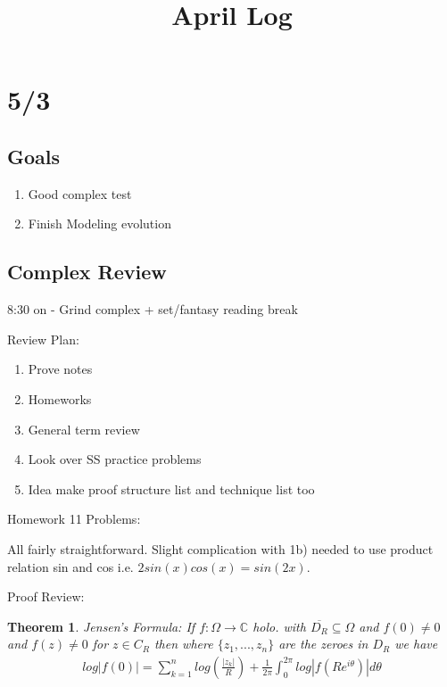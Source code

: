\documentclass[11pt]{article}
\title{April Log}
\newtheorem{theorem}{Theorem}
\theoremstyle{remark}
\begin{document}
\maketitle

\section{5/3}

\subsection{Goals}

\begin{enumerate}
	\item Good complex test
	\item Finish Modeling evolution
\end{enumerate}

\subsection{Complex Review}

8:30 on - Grind complex + set/fantasy reading break

Review Plan:

\begin{enumerate}
	\item Prove notes
	\item Homeworks
	\item General term review
	\item Look over SS practice problems
	\item Idea make proof structure list and technique list too
\end{enumerate}

Homework 11 Problems: 

All fairly straightforward. Slight complication with 1b) needed to use product relation sin and cos i.e. $2sin(x)cos(x) = sin(2x)$.

Proof Review:

\begin{theorem}
	Jensen's Formula: If $f : \Omega \to \mathbb{C}$ holo. with $\overline{D_R} \subseteq \Omega$ and $f(0) \neq 0$ and $f(z) \neq 0$ for $z \in C_R$ then where $\{z_1,...,z_n\}$ are the zeroes in $D_R$ we have
	\begin{align*}
		log|f(0)| = \sum_{k=1}^{n}log(\frac{|z_k|}{R}) + \frac{1}{2\pi}\int_{0}^{2\pi}log|f(Re^{i\theta})|d\theta
	\end{align*}
\end{theorem}
\end{document}
